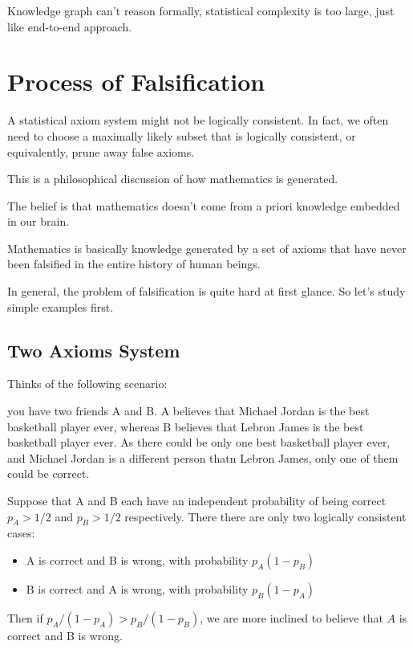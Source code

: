 \documentclass[11pt, oneside]{article}   	%
\theoremstyle{definition}
\begin{document}
Knowledge graph can't reason formally, statistical complexity is too large, just like end-to-end approach.

\section{Process of Falsification}

A statistical axiom system might not be logically consistent. In fact, we often need to choose a maximally likely subset that is logically consistent, or equivalently, prune away false axioms.

\begin{rmk}

This is a philosophical discussion of how mathematics is generated.

The belief is that mathematics doesn't come from a priori knowledge embedded in our brain.

Mathematics is basically knowledge generated by a set of axioms that have never been falsified in the entire history of human beings.
\end{rmk}

In general, the problem of falsification is quite hard at first glance. So let's study simple examples first.

\subsection{Two Axioms System}

Thinks of the following scenario:

you have two friends A and B. A believes that Michael Jordan is the best basketball player ever, whereas B believes that Lebron James is the best basketball player ever. As there could be only one best basketball player ever, and Michael Jordan is a different person thatn Lebron James, only one of them could be correct.

Suppose that A and B each have an independent probability of being correct $p_A>1/2$ and $p_B>1/2$ respectively. There there are only two logically consistent cases:
\begin{itemize}
	\item A is correct and B is wrong, with probability $p_A(1-p_B)$
	\item B is correct and A is wrong, with probability $p_B(1-p_A)$
\end{itemize}

Then if $p_A/(1-p_A) > p_B/(1-p_B)$, we are more inclined to believe that $A$ is correct and B is wrong.
\end{document}
